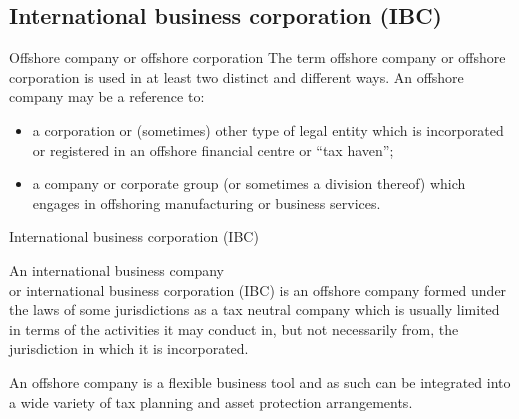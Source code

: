 \documentclass[international_finance_p2.tex]{subfiles}
\begin{document}
\subsection{International business corporation (IBC)}
\begin{frame}{Offshore company or offshore corporation}
The term offshore company or offshore corporation is used in at least two distinct and different ways. An offshore company may be a reference to:
\begin{itemize}[<+->]
\item
    a corporation or (sometimes) other type of legal entity which is incorporated or registered in an offshore financial centre or ``tax haven'';
\item
    a company or corporate group (or sometimes a division thereof) which engages in offshoring manufacturing or business services.
\end{itemize}
\end{frame}
\begin{frame}{International business corporation (IBC)}
\begin{block}{An international business company\\or international business corporation (IBC)}
\quad is an offshore company formed under the laws of some jurisdictions as a tax neutral company which is usually limited in terms of the activities it may conduct in, but not necessarily from, the jurisdiction in which it is incorporated. 
\end{block}
An offshore company is a flexible business tool and as such can be integrated into a wide variety of tax planning and asset protection arrangements. 
\end{frame}
\end{document}
